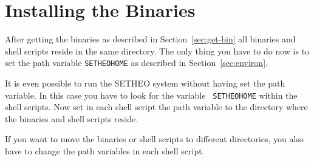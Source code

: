 %
\section{Installing the Binaries}\label{sec:inst-bin}

After getting the binaries as described in Section~\ref{sec:get-bin}
all binaries and shell scripts reside in the same directory. The only
thing you have to do now is to set the path variable {\tt SETHEOHOME}
as described in Section~\ref{sec:environ}.

It is even possible to run the SETHEO system without having set the path
variable. In this case you have to look for the variable {\tt
SETHEOHOME} within the shell scripts. Now set in each shell script the
path variable to the directory where the binaries and shell scripts
reside. 

If you want to move the binaries or shell scripts to different
directories, you also have to change the path variables in each shell
script. 
